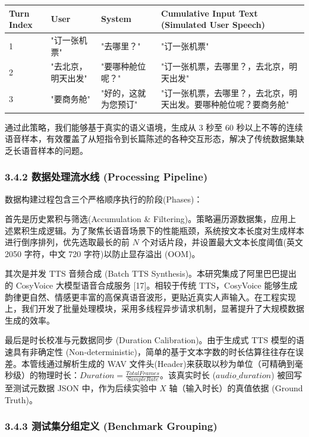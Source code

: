 \documentclass[UTF8,a4paper,12pt]{ctexart}
\begin{document}
\begin{table}[H]
\centering
\setlength{\tabcolsep}{4pt}
\renewcommand{\arraystretch}{1.2}
\begin{tabular}{|l|l|l|l|}
\hline
Turn Index & User & System & Cumulative Input Text (Simulated User Speech) \\
\hline
1 & "订一张机票" & "去哪里？" & "订一张机票" \\
\hline
2 & "去北京，明天出发" & "要哪种舱位呢？" & "订一张机票，去哪里？，去北京，明天出发" \\
\hline
3 & "要商务舱" & "好的，这就为您预订" & "订一张机票，去哪里？，去北京，明天出发。要哪种舱位呢？要商务舱" \\
\hline
\end{tabular}
\end{table}


通过此策略，我们能够基于真实的语义语境，生成从 3 秒至 60 秒以上不等的连续语音样本，有效覆盖了从短指令到长篇陈述的各种交互形态，解决了传统数据集缺乏长语音样本的问题。

\subsubsection*{3.4.2 数据处理流水线 (Processing Pipeline)}


数据构建过程包含三个严格顺序执行的阶段(Phases)：

首先是历史累积与筛选(Accumulation \& Filtering)。策略遍历源数据集，应用上述累积生成逻辑。为了聚焦长语音场景下的性能瓶颈，系统按文本长度对生成样本进行倒序排列，优先选取最长的前 $N$ 个对话片段，并设置最大文本长度阈值(英文 2050 字符，中文 720 字符)以防止显存溢出 (OOM)。

其次是并发 TTS 音频合成 (Batch TTS Synthesis)。本研究集成了阿里巴巴提出的 CosyVoice 大模型语音合成服务 [17]。相较于传统 TTS，CosyVoice 能够生成韵律更自然、情感更丰富的高保真语音波形，更贴近真实人声输入。在工程实现上，我们开发了批量处理模块，采用多线程异步请求机制，显著提升了大规模数据生成的效率。

最后是时长校准与元数据同步 (Duration Calibration)。由于生成式 TTS 模型的语速具有非确定性 (Non-deterministic)，简单的基于文本字数的时长估算往往存在误差。本管线通过解析生成的 WAV 文件头(Header)来获取以秒为单位（可精确到毫秒级）的物理时长：$Duration = \frac{TotalFrames}{SampleRate}$。该真实时长 ($audio\_duration$) 被回写至测试元数据 JSON 中，作为后续实验中 $X$ 轴（输入时长）的真值依据 (Ground Truth)。

\subsubsection*{3.4.3 测试集分组定义 (Benchmark Grouping)}
\end{document}
